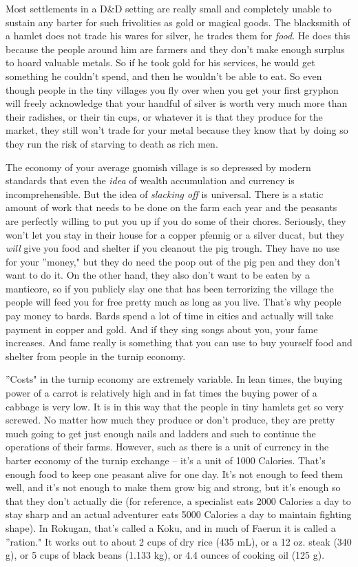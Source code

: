 Most settlements in a D\&D setting are really small and completely unable to sustain any barter for such frivolities as gold or magical goods. The blacksmith of a hamlet does not trade his wares for silver, he trades them for \textit{food}. He does this because the people around him are farmers and they don't make enough surplus to hoard valuable metals. So if he took gold for his services, he would get something he couldn't spend, and then he wouldn't be able to eat. So even though people in the tiny villages you fly over when you get your first gryphon will freely acknowledge that your handful of silver is worth very much more than their radishes, or their tin cups, or whatever it is that they produce for the market, they still won't trade for your metal because they know that by doing so they run the risk of starving to death as rich men.

The economy of your average gnomish village is so depressed by modern standards that even the \textit{idea} of wealth accumulation and currency is incomprehensible. But the idea of \textit{slacking off} is universal. There is a static amount of work that needs to be done on the farm each year and the peasants are perfectly willing to put you up if you do some of their chores. Seriously, they won't let you stay in their house for a copper pfennig or a silver ducat, but they \textit{will} give you food and shelter if you cleanout the pig trough. They have no use for your ''money," but they do need the poop out of the pig pen and they don't want to do it. On the other hand, they also don't want to be eaten by a manticore, so if you publicly slay one that has been terrorizing the village the people will feed you for free pretty much as long as you live. That's why people pay money to bards. Bards spend a lot of time in cities and actually will take payment in copper and gold. And if they sing songs about you, your fame increases. And fame really is something that you can use to buy yourself food and shelter from people in the turnip economy.

''Costs" in the turnip economy are extremely variable. In lean times, the buying power of a carrot is relatively high and in fat times the buying power of a cabbage is very low. It is in this way that the people in tiny hamlets get so very screwed. No matter how much they produce or don't produce, they are pretty much going to get just enough nails and ladders and such to continue the operations of their farms. However, such as there is a unit of currency in the barter economy of the turnip exchange -- it's a unit of 1000 Calories. That's enough food to keep one peasant alive for one day. It's not enough to feed them well, and it's not enough to make them grow big and strong, but it's enough so that they don't actually die (for reference, a specialist eats 2000 Calories a day to stay sharp and an actual adventurer eats 5000 Calories a day to maintain fighting shape). In Rokugan, that's called a Koku, and in much of Faerun it is called a ''ration." It works out to about 2 cups of dry rice (435 mL), or a 12 oz. steak (340 g), or 5 cups of black beans (1.133 kg), or 4.4 ounces of cooking oil (125 g).

